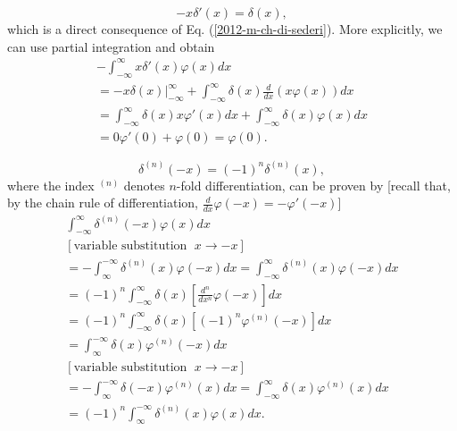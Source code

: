  \begin{equation}
 -x\delta '(x)=\delta (x),
 \end{equation}
which is a direct consequence of Eq. (\ref{2012-m-ch-di-sederi}).
{\color{OliveGreen}
\bproof
More explicitly, we can use partial integration and obtain
 \begin{equation}
 \begin{split}
-\int _{-\infty}^\infty x \delta' (x)  \varphi (x)  dx  \\
 =  - \left. x \delta (x)\right|_{-\infty}^\infty  + \int _{-\infty}^\infty \delta (x)
\frac{d}{dx}\left(x \varphi (x)\right)dx\\
 =
\int _{-\infty}^\infty \delta (x)
x \varphi' (x)  dx
+
\int _{-\infty}^\infty \delta (x)
\varphi (x) dx\\
 =
0 \varphi' (0)  +
\varphi (0)= \varphi (0).
 \end{split}
 \end{equation}
\eproof
}

 \begin{equation}
 \delta^{(n)}(-x) =(-1)^n\delta^{(n)}(x)
,
 \end{equation}
where the index $^{(n)}$ denotes $n$-fold differentiation,
can be proven by
[recall that, by the chain rule of differentiation, $\frac{d}{dx} \varphi (-x)  = - \varphi' (-x)$]
{\color{OliveGreen}
\bproof
 \begin{equation}
 \begin{split}
\int _{-\infty}^\infty \delta^{(n)} (-x)  \varphi (x)  dx  \\
[\textrm{variable substitution }\; x \rightarrow -x]\\
=
-\int _\infty^{-\infty} \delta^{(n)} (x)  \varphi (-x) dx
=
\int _{-\infty}^\infty \delta^{(n)} (x)  \varphi (-x) dx \\
 =
(-1)^n \int _{-\infty}^\infty \delta (x) \left[ \frac{d^n}{dx^n}  \varphi  (-x)\right] dx \\
 =
(-1)^n \int _{-\infty}^\infty \delta (x) \left[(-1)^n  \varphi^{(n)} (-x)\right] dx \\
 =
\int _\infty^{-\infty} \delta (x) \varphi^{(n)} (-x) dx \\
[\textrm{variable substitution }\; x \rightarrow -x]\\
=
-\int _\infty^{-\infty} \delta (-x) \varphi^{(n)} (x) dx
=
\int  _{-\infty}^\infty \delta (x) \varphi^{(n)} (x) dx \\
=
(-1)^n\int _\infty^{-\infty} \delta^{(n)} (x) \varphi (x) dx   .
 \end{split}
 \end{equation}
\eproof
}


